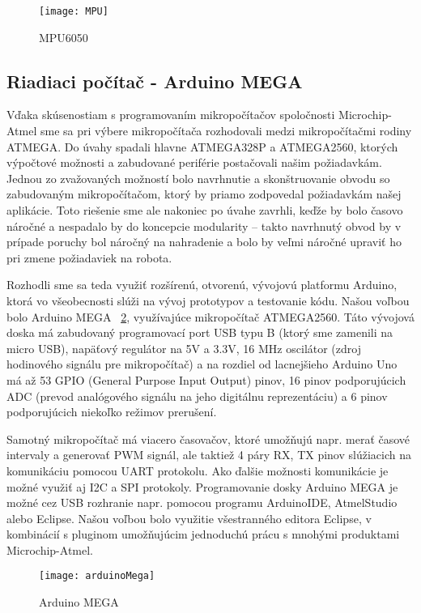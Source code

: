\begin{figure}
\centering
\texttt{[image: MPU]}
\caption{MPU6050}
\label{fig:MPU}
\end{figure}

\subsection{Riadiaci počítač - Arduino MEGA}
Vďaka skúsenostiam s programovaním mikropočítačov spoločnosti Microchip-Atmel sme sa pri výbere mikropočítača rozhodovali medzi mikropočítačmi rodiny ATMEGA. Do úvahy spadali hlavne ATMEGA328P a ATMEGA2560, ktorých výpočtové možnosti a zabudované periférie postačovali našim požiadavkám. Jednou zo zvažovaných možností bolo navrhnutie a skonštruovanie obvodu so zabudovaným mikropočítačom, ktorý by priamo zodpovedal požiadavkám našej aplikácie. Toto riešenie sme ale nakoniec po úvahe zavrhli, keďže by bolo časovo náročné a nespadalo by do koncepcie modularity – takto navrhnutý obvod by v prípade poruchy bol náročný na nahradenie a bolo by veľmi náročné upraviť ho pri zmene požiadaviek na robota.

Rozhodli sme sa teda využiť rozšírenú, otvorenú, vývojovú platformu Arduino, ktorá vo všeobecnosti slúži na vývoj prototypov a testovanie kódu. Našou voľbou bolo Arduino MEGA \figurename~\ref{fig:arduinoMega}, využívajúce mikropočítač ATMEGA2560. Táto vývojová doska má zabudovaný programovací port USB typu B (ktorý sme zamenili na micro USB), napäťový regulátor na 5V a 3.3V, 16 MHz oscilátor (zdroj hodinového signálu pre mikropočítač) a na rozdiel od lacnejšieho Arduino Uno má až 53 GPIO (General Purpose Input Output) pinov, 16 pinov podporujúcich ADC (prevod analógového signálu na jeho digitálnu reprezentáciu) a 6 pinov podporujúcich niekoľko režimov prerušení.

Samotný mikropočítač má viacero časovačov, ktoré umožňujú napr. merať časové intervaly a generovať PWM signál, ale taktiež 4 páry RX, TX pinov slúžiacich na komunikáciu pomocou UART protokolu. Ako ďalšie možnosti komunikácie je možné využiť aj I2C a SPI protokoly. Programovanie dosky Arduino MEGA je možné cez USB rozhranie napr. pomocou programu ArduinoIDE, AtmelStudio alebo Eclipse. Našou voľbou bolo využitie všestranného editora Eclipse, v kombinácií s pluginom umožňujúcim jednoduchú prácu s mnohými produktami Microchip-Atmel.

\begin{figure}
\centering
\texttt{[image: arduinoMega]}
\caption{Arduino MEGA}
\label{fig:arduinoMega}
\end{figure}

